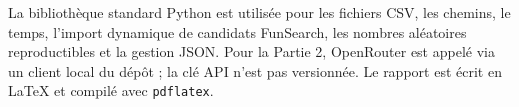 \documentclass[11pt,a4paper]{article}
\begin{document}
La bibliothèque standard Python est utilisée pour les fichiers CSV, les chemins, le temps, l'import dynamique de candidats FunSearch, les nombres aléatoires reproductibles et la gestion JSON. Pour la Partie 2, OpenRouter est appelé via un client local du dépôt ; la clé API n'est pas versionnée. Le rapport est écrit en LaTeX et compilé avec \texttt{pdflatex}.
\end{document}
